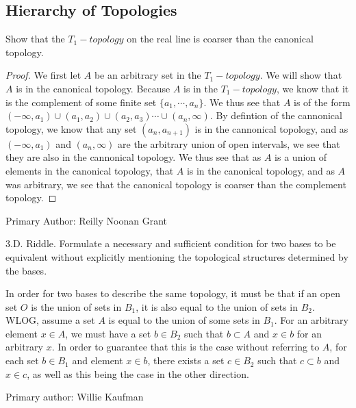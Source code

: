 \subsection{Hierarchy of Topologies}
\begin{minorEx}%
  Show that the $T_1-topology$ on the real line is coarser than the canonical topology.
\end{minorEx}
\begin{proof}
  We first let $A$ be an arbitrary set in the $T_1-topology$. We will show that $A$ is in the canonical topology. Because $A$ is in the $T_1-topology$, we know that it is the complement of some finite set $\{a_1,\cdots,a_n\}$. We thus see that $A$ is of the form $(-\infty,a_1)\cup (a_1,a_2) \cup (a_2,a_3) \cdots \cup (a_n,\infty)$. By defintion of the cannonical topology, we know that any set $(a_n,a_{n+1})$ is in the cannonical topology, and as $(-\infty,a_1)$ and $ (a_n,\infty)$ are the arbitrary union of open intervals, we see that they are also in the cannonical topology. We thus see that as $A$ is a union of elements in the canonical topology, that $A$ is in the canonical topology, and as $A$ was arbitrary, we see that the canonical topology is coarser than the complement topology.
\end{proof}
Primary Author: Reilly Noonan Grant


\begin{majorEx}
3.D. Riddle. Formulate a necessary and sufficient condition for two bases
to be equivalent without explicitly mentioning the topological structures
determined by the bases.
\end{majorEx}
In order for two bases to describe the same topology, it must be that if an open set $O$ is the union of sets in $B_1$, it is also equal to the union of sets in $B_2$. WLOG, assume a set $A$ is equal to the union of some sets in $B_1$. For an arbitrary element $x \in A$, we must have a set $b \in B_2$ such that $b \subset A$ and $x \in b$ for an arbitrary $x$. In order to guarantee that this is the case without referring to $A$, for each set $b \in B_1$ and element $x \in b$, there exists a set $c \in B_2$ such that $c \subset b$ and $x \in c$, as well as this being the case in the other direction.

Primary author: Willie Kaufman
